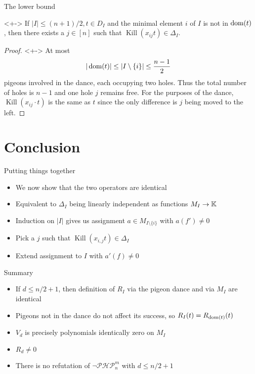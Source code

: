 \documentclass[xcolor={dvipsnames}, aspectratio=169, handout]{beamer}
\newcommand{\PHP}{\ensuremath{\neg \mathcal{PHP}^m_n}\xspace}
\renewcommand{\K}{\operatorname{Kill}}
\begin{document}
\begin{frame}{The lower bound}
    \begin{theorem}<+->
        If $|I| \leq (n+1) / 2, t \in D_I$ and the minimal element $i$ of $I$ is not in $\operatorname{dom}(t)$, then there exists a $j \in [n]$ such that $\K(x_{ij} t) \in \Delta_I$.
    \end{theorem}
    \begin{proof}[Proof\nopunct{}]<+->
        At most $$
            |\operatorname{dom}(t)| \leq |I \setminus \{i\}| \leq \frac{n - 1}{2}
        $$ pigeons involved in the dance, each occupying two holes. Thus the total number of holes is $n - 1$ and one hole $j$ remains free. For the purposes of the dance, $\K(x_{ij} \cdot t)$ is the same as $t$ since the only difference is $j$ being moved to the left.
    \end{proof}
\end{frame}

\section{Conclusion}

\begin{frame}{Putting things together}
    \begin{itemize}[<+->]
        \item We now show that the two operators are identical
        \item Equivalent to $\Delta_I$ being linearly independent as functions $M_I \to \mathbb{K}$
        \item Induction on $|I|$ gives us assignment $a \in M_{I\setminus \{i\}}$ with $a(f') \neq 0$
        \item Pick a $j$ such that $\K(x_{i, j} t) \in \Delta_I$
        \item Extend assignment to $I$ with $a'(f) \neq 0$
    \end{itemize}
\end{frame}

\begin{frame}{Summary}
    \begin{itemize}[<+->]
        \item If $d \leq n/2 + 1$, then definition of $R_I$ via the pigeon dance and via $M_I$ are identical
        \item Pigeons not in the dance do not affect its success, so $R_I(t) = R_{\operatorname{dom}(t)}(t)$
        \item $V_d$ is precisely polynomials identically zero on $M_I$
        \item $R_d \neq 0$
        \item There is no refutation of \PHP with $d \leq n/2 +1$
    \end{itemize}
\end{frame}
\end{document}

